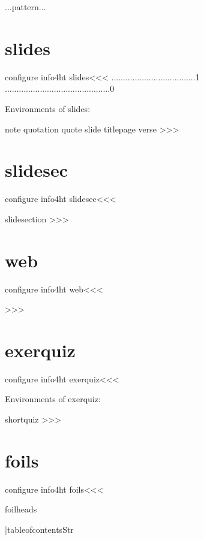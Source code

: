 {{{{\begin{tabular / array}{...pattern...}
\begin{...}
\section{slides}
                
\<configure info4ht slides\><<<
....................................1
.............................................0

%

Environments of slides:

   note
   quotation
   quote
   slide
   titlepage
   verse
>>>


\section{slidesec}
                
\<configure info4ht slidesec\><<<
    \ConfigureToc

          slidesection
>>>

\section{web}
                
\<configure info4ht web\><<<

>>>

\section{exerquiz}
                
\<configure info4ht exerquiz\><<<
%

Environments of exerquiz:

   shortquiz
>>>

\section{foils}
                
\<configure info4ht foils\><<<
    \ConfigureToc

         foilheads


|tableofcontentsStr


\end{...}
\end{tabular / array}}}}}
